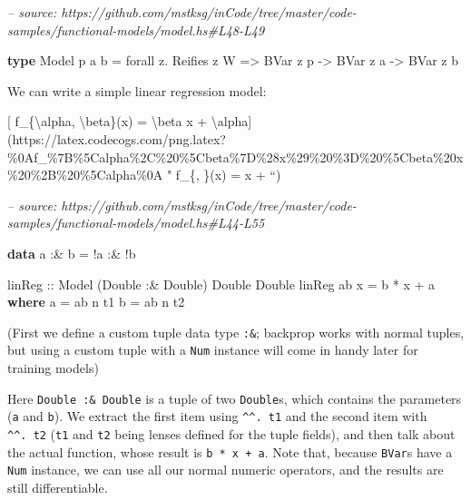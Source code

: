 \documentclass[]{article}
\newenvironment{Shaded}{}{}
\newcommand{\CommentTok}[1]{\textcolor[rgb]{0.38,0.63,0.69}{\textit{#1}}}
\newcommand{\DataTypeTok}[1]{\textcolor[rgb]{0.56,0.13,0.00}{#1}}
\newcommand{\FunctionTok}[1]{\textcolor[rgb]{0.02,0.16,0.49}{#1}}
\newcommand{\KeywordTok}[1]{\textcolor[rgb]{0.00,0.44,0.13}{\textbf{#1}}}
\newcommand{\NormalTok}[1]{#1}
\newcommand{\OtherTok}[1]{\textcolor[rgb]{0.00,0.44,0.13}{#1}}
\begin{document}
\begin{Shaded}
\begin{Highlighting}[]
\CommentTok{-- source: https://github.com/mstksg/inCode/tree/master/code-samples/functional-models/model.hs#L48-L49}

\KeywordTok{type} \DataTypeTok{Model}\NormalTok{ p a b }\FunctionTok{=}\NormalTok{ forall z}\FunctionTok{.} \DataTypeTok{Reifies}\NormalTok{ z }\DataTypeTok{W}
                \OtherTok{=>} \DataTypeTok{BVar}\NormalTok{ z p }\OtherTok{->} \DataTypeTok{BVar}\NormalTok{ z a }\OtherTok{->} \DataTypeTok{BVar}\NormalTok{ z b}
\end{Highlighting}
\end{Shaded}

We can write a simple linear regression model:

{[} f\_\{\textbackslash{}alpha, \textbackslash{}beta\}(x) = \textbackslash{}beta
x +
\textbackslash{}alpha{]}(https://latex.codecogs.com/png.latex?\%0Af\_\%7B\%5Calpha\%2C\%20\%5Cbeta\%7D\%28x\%29\%20\%3D\%20\%5Cbeta\%20x\%20\%2B\%20\%5Calpha\%0A
" f\_\{\alpha, \beta\}(x) = \beta x + \alpha ``)

\begin{Shaded}
\begin{Highlighting}[]
\CommentTok{-- source: https://github.com/mstksg/inCode/tree/master/code-samples/functional-models/model.hs#L44-L55}

\KeywordTok{data}\NormalTok{ a }\FunctionTok{:&}\NormalTok{ b }\FunctionTok{=} \FunctionTok{!}\NormalTok{a }\FunctionTok{:&} \FunctionTok{!}\NormalTok{b}

\OtherTok{linReg ::} \DataTypeTok{Model}\NormalTok{ (}\DataTypeTok{Double} \FunctionTok{:&} \DataTypeTok{Double}\NormalTok{) }\DataTypeTok{Double} \DataTypeTok{Double}
\NormalTok{linReg ab x }\FunctionTok{=}\NormalTok{ b }\FunctionTok{*}\NormalTok{ x }\FunctionTok{+}\NormalTok{ a}
  \KeywordTok{where}
\NormalTok{    a }\FunctionTok{=}\NormalTok{ ab }\FunctionTok{^^.}\NormalTok{ t1}
\NormalTok{    b }\FunctionTok{=}\NormalTok{ ab }\FunctionTok{^^.}\NormalTok{ t2}
\end{Highlighting}
\end{Shaded}

(First we define a custom tuple data type \texttt{:\&}; backprop works with
normal tuples, but using a custom tuple with a \texttt{Num} instance will come
in handy later for training models)

Here \texttt{Double\ :\&\ Double} is a tuple of two \texttt{Double}s, which
contains the parameters (\texttt{a} and \texttt{b}). We extract the first item
using \texttt{\^{}\^{}.\ t1} and the second item with \texttt{\^{}\^{}.\ t2}
(\texttt{t1} and \texttt{t2} being lenses defined for the tuple fields), and
then talk about the actual function, whose result is \texttt{b\ *\ x\ +\ a}.
Note that, because \texttt{BVar}s have a \texttt{Num} instance, we can use all
our normal numeric operators, and the results are still differentiable.
\end{document}
